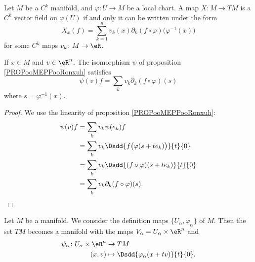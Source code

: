 \begin{lemma}        \label{LEMooZWFAooDlYaJm}
	Let \( M\) be a \( C^k\) manifold, and \( \varphi\colon U\to M\) be a local chart. A map \( X\colon M\to TM\) is a \( C^k\) vector field on \( \varphi(U)\) if and only it can be written under the form
	\begin{equation}
		X_x(f)=\sum_{k=1}^nv_k(x)\partial_k(f\circ\varphi)\big( \varphi^{-1}(x) \big)
	\end{equation}
	for some \( C^k\) maps \( v_k\colon M\to \eR\).
\end{lemma}

\begin{lemma}       \label{LEMooIQZWooOSLNXB}
	If \( x\in M\) and \( v\in \eR^n\). The isomorphism \( \psi\) of proposition \ref{PROPooMEPPooRonxuh} satisfies
	\begin{equation}        \label{EQooBVOBooBTfYWC}
		\psi(v)f=\sum_kv_k\partial_k(f\circ\varphi)(s)
	\end{equation}
	where \( s=\varphi^{-1}(x)\).
\end{lemma}

\begin{proof}
	We use the linearity of proposition \ref{PROPooMEPPooRonxuh}:
	\begin{subequations}
		\begin{align}
			\psi(v)f & =\sum_kv_k\psi(e_k)f                                  \\
			         & =\sum_kv_k\Dsdd{ f\big( \varphi(s+te_k) \big) }{t}{0} \\
			         & =\sum_kv_k\Dsdd{ (f\circ\varphi)(s+te_k) }{t}{0}      \\
			         & =\sum_kv_k\partial_k(f\circ\varphi)(s).
		\end{align}
	\end{subequations}
\end{proof}

\begin{theorem}     \label{THOooTSQXooLvJMQb}
	Let \( M\) be a manifold. We consider the definition maps \( \{ U_{\alpha}, \varphi_{\alpha} \}\) of \( M\). Then the set \( TM\) becomes a manifold with the maps \( V_{\alpha}=U_{\alpha}\times \eR^n\) and
	\begin{equation}
		\begin{aligned}
			\psi_{\alpha}\colon U_{\alpha}\times \eR^n & \to TM                                         \\
			(x,v)                                      & \mapsto \Dsdd{ \varphi_{\alpha}(x+tv) }{t}{0}.
		\end{aligned}
	\end{equation}
\end{theorem}



